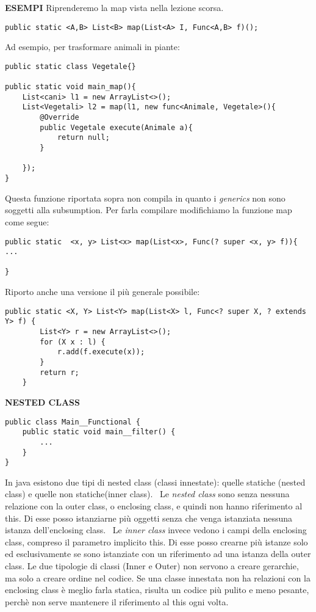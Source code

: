 \noindent \textbf{ESEMPI} \newline
\noindent Riprenderemo la map vista nella lezione scorsa.
\begin{lstlisting}[basicstyle=\small,]
public static <A,B> List<B> map(List<A> I, Func<A,B> f)();
\end{lstlisting}
Ad esempio, per trasformare animali in piante: 
\begin{lstlisting}[basicstyle=\small,]
public static class Vegetale{}

public static void main_map(){
	List<cani> l1 = new ArrayList<>();
	List<Vegetali> l2 = map(l1, new func<Animale, Vegetale>(){
		@Override
		public Vegetale execute(Animale a){
			return null;
		}
	
	});
}
\end{lstlisting}
\noindent Questa funzione riportata sopra non compila in quanto i \textit{generics} non sono soggetti alla subsumption. Per farla compilare modifichiamo la funzione map come segue: 

\begin{lstlisting}[basicstyle=\small,]
public static  <x, y> List<x> map(List<x>, Func(? super <x, y> f)){
...

}
\end{lstlisting}

\noindent Riporto anche una versione il più generale possibile: \newline

\begin{lstlisting}[basicstyle=\small,]
    public static <X, Y> List<Y> map(List<X> l, Func<? super X, ? extends Y> f) {
        List<Y> r = new ArrayList<>();
        for (X x : l) {
            r.add(f.execute(x));
        }
        return r;
    } 
\end{lstlisting}

\noindent \textbf{NESTED CLASS}\newline
\begin{lstlisting}[basicstyle=\small,]
public class Main__Functional {
	public static void main__filter() {
		...
	}
}
\end{lstlisting}
In java esistono due tipi di nested class (classi innestate): quelle statiche (nested class) e quelle non statiche(inner class).\newline
\textbullet\ Le \textit{nested class} sono senza nessuna relazione con la outer class, o enclosing class, e quindi non hanno riferimento al this. Di esse posso istanziarne più oggetti senza che venga istanziata nessuna istanza dell'enclosing class. \newline
\textbullet\ Le \textit{inner class} invece vedono i campi della enclosing class, compreso il parametro implicito this. Di esse posso crearne più istanze solo ed esclusivamente se sono istanziate con un riferimento ad una istanza della outer class. \newline
Le due tipologie di classi (Inner e Outer) non servono a creare gerarchie, ma solo a creare ordine nel codice.\newline
Se una classe innestata non ha relazioni con la enclosing class è meglio farla statica, risulta un codice più pulito e meno pesante, perchè non serve mantenere il riferimento al this ogni volta.

